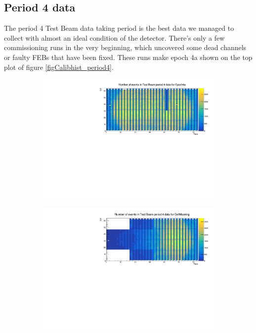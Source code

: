 \documentclass[12pt,a4paper]{article}
\begin{document}
\FloatBarrier
\subsection{Period 4 data}\label{secTBPeriod4}

The period 4 Test Beam data taking period is the best data we managed to collect with almost an ideal condition of the detector. There's only a few commissioning runs in the very beginning, which uncovered some dead channels or faulty FEBs that have been fixed. These runs make epoch 4a shown on the top plot of figure \ref{figCalibhist_period4}.

\begin{figure}[!hbtp]
\centering
\begin{subfigure}[b]{\textwidth}
\centering
\includegraphics[width=.9\textwidth]{Plots/Attenprofs_P4Data_CellPlane_Epoch4a.pdf}
\end{subfigure}
\begin{subfigure}[b]{\textwidth}
\centering
\includegraphics[width=.9\textwidth]{Plots/Attenprofs_P4Data_CellPlane_CellMasking.pdf}

\end{subfigure}
\end{figure}
\end{document}
